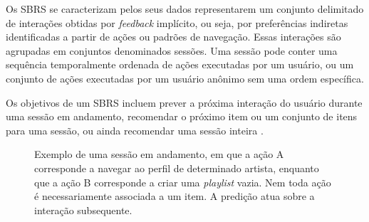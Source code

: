 Os SBRS se caracterizam pelos seus dados representarem um conjunto delimitado de
interações obtidas por \textit{feedback} implícito, ou seja, por preferências
indiretas identificadas a partir de ações ou padrões de navegação. Essas interações
são agrupadas em conjuntos denominados sessões. Uma sessão pode conter uma sequência temporalmente
ordenada de ações executadas por um usuário, ou um conjunto de ações executadas
por um usuário anônimo sem uma ordem específica.

Os objetivos de um SBRS incluem
prever a próxima interação do usuário durante uma sessão em andamento,
recomendar o próximo item ou um conjunto de itens para uma sessão, ou ainda
recomendar uma sessão inteira \cite{domingues_large_2023, survey_wang_2021}.


    



\begin{figure}[h]
    \centering
    \caption{Exemplo de uma sessão em andamento, em que a ação A corresponde a navegar ao perfil de determinado artista, enquanto que a ação B corresponde a criar uma \textit{playlist} vazia. Nem toda ação é necessariamente associada a um item. A predição atua sobre a interação subsequente.}
\end{figure}

